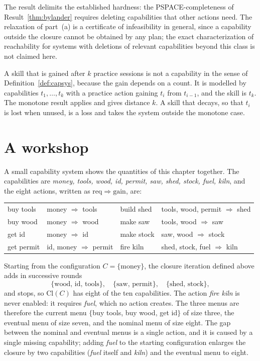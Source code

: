 The result delimits the established hardness: the PSPACE-completeness of Result~\ref{thm:bylander} requires deleting capabilities that other actions need. The relaxation of part~(a) is a certificate of infeasibility in general, since a capability outside the closure cannot be obtained by any plan; the exact characterization of reachability for systems with deletions of relevant capabilities beyond this class is not claimed here.

\begin{example}[Training]\label{ex:training}
A skill that is gained after $k$ practice sessions is not a capability in the sense of Definition~\ref{def:capsys}, because the gain depends on a count. It is modelled by capabilities $t_1,\dots,t_k$ with a practice action gaining $t_{i}$ from $t_{i-1}$, and the skill is $t_k$. The monotone result applies and gives distance $k$. A skill that decays, so that $t_i$ is lost when unused, is a loss and takes the system outside the monotone case.
\end{example}


\section{A workshop}\label{sec:workshop}

A small capability system shows the quantities of this chapter together. The capabilities are \emph{money, tools, wood, id, permit, saw, shed, stock, fuel, kiln}, and the eight actions, written as $\mathrm{req}\Rightarrow\mathrm{gain}$, are:
\begin{center}
\begin{tabular}{@{}ll@{\qquad}ll@{}}
buy tools & money $\Rightarrow$ tools & build shed & tools, wood, permit $\Rightarrow$ shed\\
buy wood & money $\Rightarrow$ wood & make saw & tools, wood $\Rightarrow$ saw\\
get id & money $\Rightarrow$ id & make stock & saw, wood $\Rightarrow$ stock\\
get permit & id, money $\Rightarrow$ permit & fire kiln & shed, stock, fuel $\Rightarrow$ kiln
\end{tabular}
\end{center}
Starting from the configuration $C=\{\mathrm{money}\}$, the closure iteration defined above adds in successive rounds
\[
\{\text{wood, id, tools}\},\quad\{\text{saw, permit}\},\quad\{\text{shed, stock}\},
\]
and stops, so $\mathrm{Cl}(C)$ has eight of the ten capabilities. The action \emph{fire kiln} is never enabled: it requires \emph{fuel}, which no action creates. The three menus are therefore the current menu $\{$buy tools, buy wood, get id$\}$ of size three, the eventual menu of size seven, and the nominal menu of size eight. The gap between the nominal and eventual menus is a single action, and it is caused by a single missing capability; adding \emph{fuel} to the starting configuration enlarges the closure by two capabilities (\emph{fuel} itself and \emph{kiln}) and the eventual menu to eight.

